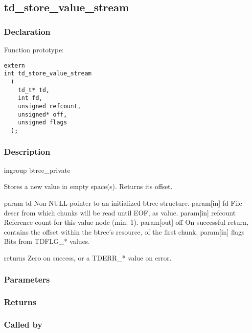 
\newpage
\subsection{td\_store\_value\_stream}
\subsubsection{Declaration} Function prototype:

\begin{verbatim}
extern
int td_store_value_stream
  (
    td_t* td,
    int fd,
    unsigned refcount,
    unsigned* off,
    unsigned flags
  );
\end{verbatim}

\subsubsection{Description}


 ingroup btree\_private

 Stores a new value in empty space(s). Returns its offset.

 param td Non-NULL pointer to an initialized btree structure.
 param[in] fd File descr from which chunks will be read until EOF, as value.
 param[in] refcount Reference count for this value node (min. 1).
 param[out] off On successful return, contains the offset within
 the btree's resource, of the first chunk.
 param[in] flags Bits from TDFLG\_* values.

 returns Zero on success, or a TDERR\_* value on error.
 

\subsubsection{Parameters}
\subsubsection{Returns}
\subsubsection{Called by}
